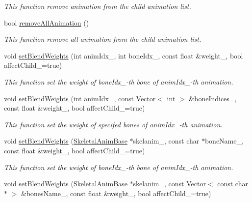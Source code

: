 \begin{DoxyCompactItemize}
\begin{DoxyCompactList}\small\item\em This function remove animation from the child animation list. \end{DoxyCompactList}\item 
bool \hyperlink{class_magnum_1_1_skeletal_anim_blender_af2a93dc8cde09f0ac468f037539f085d}{remove\+All\+Animation} ()
\begin{DoxyCompactList}\small\item\em This function remove all animation from the child animation list. \end{DoxyCompactList}\item 
void \hyperlink{class_magnum_1_1_skeletal_anim_blender_acdb8305c5d999eebb633de6e631a8c8b}{set\+Blend\+Weights} (int anim\+Idx\+\_\+, int bone\+Idx\+\_\+, const float \&weight\+\_\+, bool affect\+Child\+\_\+=true)
\begin{DoxyCompactList}\small\item\em This function set the weight of bone\+Idx\+\_\+-\/th bone of anim\+Idx\+\_\+-\/th animation. \end{DoxyCompactList}\item 
void \hyperlink{class_magnum_1_1_skeletal_anim_blender_af2dc948d0b1767393e1c5d42f994743f}{set\+Blend\+Weights} (int anim\+Idx\+\_\+, const \hyperlink{class_magnum_1_1_vector}{Vector}$<$ int $>$ \&bone\+Indices\+\_\+, const float \&weight\+\_\+, bool affect\+Child\+\_\+=true)
\begin{DoxyCompactList}\small\item\em This function set the weight of specifed bones of anim\+Idx\+\_\+-\/th animation. \end{DoxyCompactList}\item 
void \hyperlink{class_magnum_1_1_skeletal_anim_blender_a54689afab6362501f7a2b9cb8256ba92}{set\+Blend\+Weights} (\hyperlink{class_magnum_1_1_skeletal_anim_base}{Skeletal\+Anim\+Base} $\ast$skelanim\+\_\+, const char $\ast$bone\+Name\+\_\+, const float \&weight\+\_\+, bool affect\+Child\+\_\+=true)
\begin{DoxyCompactList}\small\item\em This function set the weight of bone\+Idx\+\_\+-\/th bone of anim\+Idx\+\_\+-\/th animation. \end{DoxyCompactList}\item 
void \hyperlink{class_magnum_1_1_skeletal_anim_blender_a9aa907fdb5dc8bb6efb4236ac4a6b311}{set\+Blend\+Weights} (\hyperlink{class_magnum_1_1_skeletal_anim_base}{Skeletal\+Anim\+Base} $\ast$skelanim\+\_\+, const \hyperlink{class_magnum_1_1_vector}{Vector}$<$ const char $\ast$ $>$ \&bones\+Name\+\_\+, const float \&weight\+\_\+, bool affect\+Child\+\_\+=true)

\end{DoxyCompactItemize}
